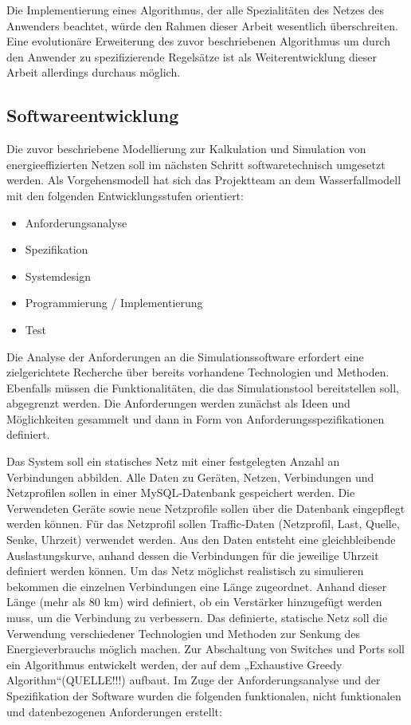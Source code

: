 Die Implementierung eines Algorithmus, der alle Spezialitäten des Netzes des Anwenders beachtet, würde den Rahmen dieser Arbeit wesentlich überschreiten. Eine evolutionäre Erweiterung des zuvor beschriebenen Algorithmus um durch den Anwender zu spezifizierende Regelsätze ist als Weiterentwicklung dieser Arbeit allerdings durchaus möglich.


\subsection{Softwareentwicklung}\label{subsec:MethSoftwareEng}
Die zuvor beschriebene Modellierung zur Kalkulation und Simulation von energieeffizierten Netzen soll im nächsten Schritt softwaretechnisch umgesetzt werden. Als Vorgehensmodell hat sich das Projektteam an dem Wasserfallmodell mit den folgenden Entwicklungsstufen orientiert:
\begin{itemize}
\item Anforderungsanalyse
\item Spezifikation
\item Systemdesign
\item Programmierung / Implementierung
\item Test
\end{itemize}
Die Analyse der Anforderungen an die Simulationssoftware erfordert eine zielgerichtete Recherche über bereits vorhandene Technologien und Methoden. Ebenfalls müssen die Funktionalitäten, die das Simulationstool bereitstellen soll, abgegrenzt werden. Die Anforderungen werden zunächst als Ideen und Möglichkeiten gesammelt und dann in Form von Anforderungsspezifikationen definiert. 


Das System soll ein statisches Netz mit einer festgelegten Anzahl an Verbindungen abbilden. Alle Daten zu Geräten, Netzen, Verbindungen und Netzprofilen sollen in einer MySQL-Datenbank gespeichert werden. Die Verwendeten Geräte sowie neue Netzprofile sollen über die Datenbank eingepflegt werden können. Für das Netzprofil sollen Traffic-Daten (Netzprofil, Last, Quelle, Senke, Uhrzeit) verwendet werden. Aus den Daten entsteht eine gleichbleibende Auslastungskurve, anhand dessen die Verbindungen für die jeweilige Uhrzeit definiert werden können. Um das Netz möglichst realistisch zu simulieren bekommen die einzelnen Verbindungen eine Länge zugeordnet. Anhand dieser Länge (mehr als 80 km) wird definiert, ob ein Verstärker hinzugefügt werden muss, um die Verbindung zu verbessern. Das definierte, statische Netz soll die Verwendung verschiedener Technologien und Methoden zur Senkung des Energieverbrauchs möglich machen. Zur Abschaltung von Switches und Ports soll ein Algorithmus entwickelt werden, der auf dem „Exhaustive Greedy Algorithm“(QUELLE!!!) aufbaut.
Im Zuge der Anforderungsanalyse und der Spezifikation der Software wurden die folgenden funktionalen, nicht funktionalen und datenbezogenen Anforderungen erstellt:



